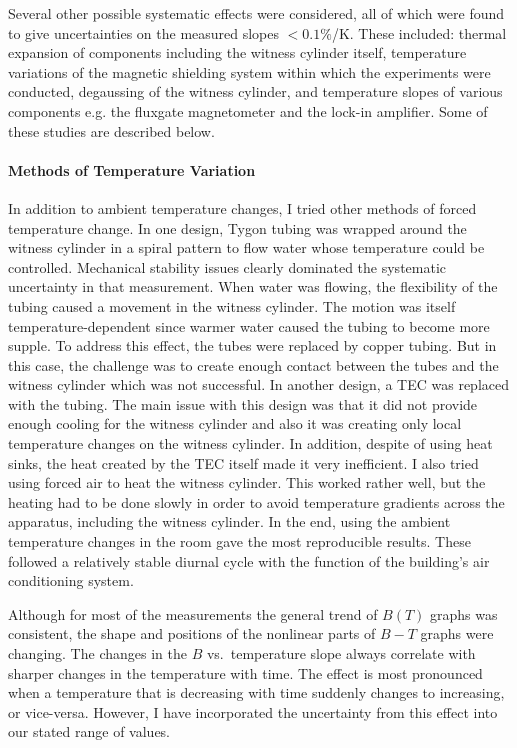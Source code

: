 Several other possible systematic effects were considered, all of
which were found to give uncertainties on the measured slopes
$<0.1\%$/K.  These included: thermal expansion of components including
the witness cylinder itself, temperature variations of the magnetic
shielding system within which the experiments were conducted,
degaussing of the witness cylinder, and temperature slopes of various
components e.g. the fluxgate magnetometer and the lock-in amplifier.
Some of these studies are described below.



\paragraph{Methods of Temperature Variation}
In addition to ambient temperature changes, I tried other methods of
forced temperature change.  In one design, Tygon tubing was wrapped
around the witness cylinder in a spiral pattern to flow water whose
temperature could be controlled.  Mechanical stability issues clearly
dominated the systematic uncertainty in that measurement. When water
was flowing, the flexibility of the tubing caused a movement in the
witness cylinder. The motion was itself temperature-dependent since
warmer water caused the tubing to become more supple.  To address this
effect, the tubes were replaced by copper tubing.  But in this case,
the challenge was to create enough contact between the tubes and the
witness cylinder which was not successful. In another design, a TEC
was replaced with the tubing. The main issue with this design was that
it did not provide enough cooling for the witness cylinder and also it
was creating only local temperature changes on the witness
cylinder. In addition, despite of using heat sinks, the heat created
by the TEC itself made it very inefficient. I also tried using
forced air to heat the witness cylinder. This worked rather well, but
the heating had to be done slowly in order to avoid temperature
gradients across the apparatus, including the witness cylinder. In
the end, using the ambient temperature changes in the room gave the
most reproducible results.  These followed a relatively stable diurnal
cycle with the function of the building's air conditioning system.

Although for most of the measurements the general trend of $B(T)$
graphs was consistent, the shape and positions of the nonlinear parts
of $B-T$ graphs were changing.  The changes in the $B$ vs.~temperature
slope always correlate with sharper changes in the temperature with
time.  The effect is most pronounced when a temperature that is
decreasing with time suddenly changes to increasing, or vice-versa.
However, I have incorporated the uncertainty from this effect into our
stated range of values.




